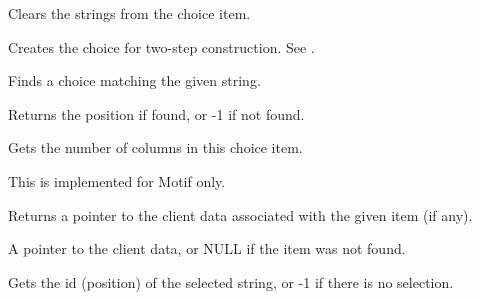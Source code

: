 Clears the strings from the choice item.

\label{wxchoicecreate}


Creates the choice for two-step construction. See .

\label{wxchoicefindstring}


Finds a choice matching the given string.




Returns the position if found, or -1 if not found.

\label{wxchoicegetcolumns}


Gets the number of columns in this choice item.


This is implemented for Motif only.

\label{wxchoicegetclientdata}


Returns a pointer to the client data associated with the given item (if any).




A pointer to the client data, or NULL if the item was not found.

\label{wxchoicegetselection}


Gets the id (position) of the selected string, or -1 if there is no selection.

\label{wxchoicegetstring}

